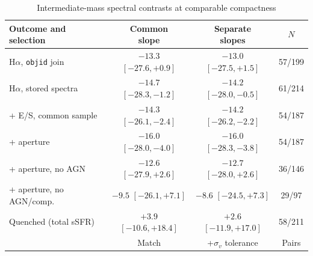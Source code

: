 \documentclass{aa}
\begin{document}
\begin{appendix}
\begin{table}
  \centering
  \caption{Intermediate-mass spectral contrasts at comparable compactness}
  \label{tab:spectral_variants}
  \tabcolsep=2pt
  \begin{tabular}{@{}>{\raggedright\arraybackslash}p{}ccc@{}}
    \hline\hline
    Outcome and selection & \makecell{Common\\slope} & \makecell{Separate\\slopes} & \(N\) \\
    \hline


    H\(\alpha\), \texttt{objid} join & \makecell{\(-13.3\)\\\([-27.6, +0.9]\)} & \makecell{\(-13.0\)\\\([-27.5, +1.5]\)} & 57/199 \\

    H\(\alpha\), stored spectra & \makecell{\(-14.7\)\\\([-28.3, -1.2]\)} & \makecell{\(-14.2\)\\\([-28.0, -0.5]\)} & 61/214 \\

    + E/S, common sample & \makecell{\(-14.3\)\\\([-26.1, -2.4]\)} & \makecell{\(-14.2\)\\\([-26.2, -2.2]\)} & 54/187 \\

    + aperture & \makecell{\(-16.0\)\\\([-28.0, -4.0]\)} & \makecell{\(-16.0\)\\\([-28.3, -3.8]\)} & 54/187 \\

    + aperture, no AGN & \makecell{\(-12.6\)\\\([-27.9, +2.6]\)} & \makecell{\(-12.7\)\\\([-28.0, +2.6]\)} & 36/146 \\

    + aperture, no AGN/comp. & \makecell{\(-9.5\)\\\([-26.1, +7.1]\)} & \makecell{\(-8.6\)\\\([-24.5, +7.3]\)} & 29/97 \\

    Quenched (total sSFR) & \makecell{\(+3.9\)\\\([-10.6, +18.4]\)} & \makecell{\(+2.6\)\\\([-11.9, +17.0]\)} & 58/211 \\

    \hline
    & Match & \makecell{+\(\sigma_v\)\\tolerance} & Pairs \\
    \hline


\end{tabular}
\end{table}
\end{appendix}
\end{document}

